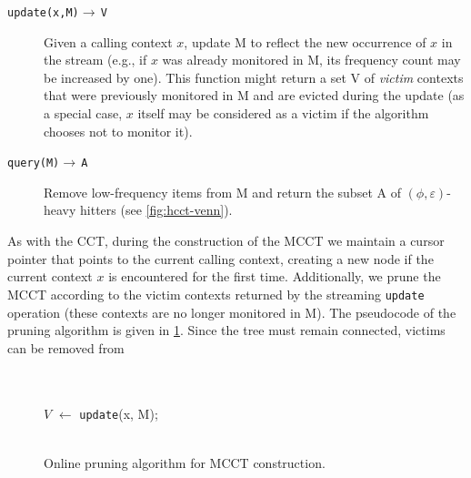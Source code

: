 \begin{description}
\item[{\tt update(x,M)}$\rightarrow\,${\tt V}] Given a calling context $x$, update M to reflect the new occurrence of $x$ in the stream (e.g., if $x$ was already monitored in M, its frequency count may be increased by one). This function might return a set V of {\em victim} contexts that were previously monitored in M and are evicted during the update (as a special case, $x$ itself may be considered as a victim if the algorithm chooses not to monitor it).
\item[{\tt query(M)}$\rightarrow\,${\tt A}] Remove low-frequency items from M and return the subset A of $(\phi,\varepsilon)$-heavy hitters (see \myfigure\ref{fig:hcct-venn}).
\end{description}

\ifauthorea{}{\par\begingroup \parfillskip 0pt \relax}
\noindent As with the CCT, during the construction of the MCCT we maintain a cursor pointer that points to the current calling context, creating a new node if the current context $x$ is encountered for the first time. Additionally, we prune the MCCT according to the victim contexts returned by the streaming {\tt update} operation (these contexts are no longer monitored in M). The pseudocode of the pruning algorithm is given in \myalgorithm\ref{alg:hcct-update}. Since the tree must remain connected, victims can be removed from
\ifauthorea{}{\par\endgroup}

\ifdefined\noauthorea
\begin{figure}[h!]
\IncMargin{2em}
\begin{algorithm}[H]
\LinesNumbered
\SetAlgoNoLine
\SetNlSkip{1.5em} 
\Indm\Indmm
\nonl\hrulefill\\
\vspace{-2mm}\hrulefill\\
\Indp\Indpp
$V$ $\gets$ {\tt update}(x, M);\\
\vspace{-2mm}
\Indm\Indmm
\nonl\hrulefill\vspace{1mm}\\
\DecMargin{2em}
\caption{\label{alg:hcct-update} Online pruning algorithm for MCCT construction.}
\end{algorithm}
\end{figure}


